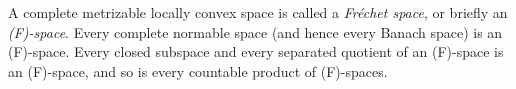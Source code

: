 A complete metrizable locally convex space is called a \textit{Fr\'echet space}, or briefly an \textit{(F)-space}. Every complete normable space (and hence every Banach space) is an (F)-space. Every closed subspace and every separated quotient of an (F)-space is an (F)-space, and so is every countable product of (F)-spaces.
